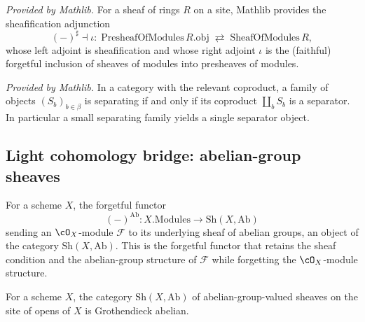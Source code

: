 \begin{lemma}
  \label{mathlib:sheafification_adjunction}
  \mathlibok
  \textit{Provided by Mathlib.}
  For a sheaf of rings \(R\) on a site, Mathlib provides the sheafification adjunction
  \[
    (-)^{\sharp}\dashv \iota:\;\mathrm{PresheafOfModules}\,R.\mathrm{obj}
    \;\rightleftarrows\;\mathrm{SheafOfModules}\,R ,
  \]
  whose left adjoint is sheafification and whose right adjoint \(\iota\) is the
  (faithful) forgetful inclusion of sheaves of modules into presheaves of modules.
\end{lemma}

\begin{lemma}
  \label{mathlib:isSeparator_sigma}
  \mathlibok
  \textit{Provided by Mathlib.}
  In a category with the relevant coproduct, a family of objects
  \((S_b)_{b\in\beta}\) is separating if and only if its coproduct
  \(\coprod_{b}S_b\) is a separator.  In particular a small separating family
  yields a single separator object.
\end{lemma}

\subsection{Light cohomology bridge: abelian-group sheaves}

\begin{definition}
  \label{found:modules_to_absheaf}
  For a scheme \(X\), the forgetful functor
  \[
    (-)^{\mathrm{Ab}}:X.\mathrm{Modules}\to\mathrm{Sh}(X,\mathrm{Ab})
  \]
  sending an \(\cO_X\)-module \(\mathcal F\) to its underlying sheaf of abelian
  groups, an object of the category \(\mathrm{Sh}(X,\mathrm{Ab})\).  This is the
  forgetful functor that retains the sheaf condition and the abelian-group
  structure of \(\mathcal F\) while forgetting the \(\cO_X\)-module structure.
\end{definition}

\begin{lemma}
  \label{found:absheaf_groth_abelian}
  For a scheme \(X\), the category \(\mathrm{Sh}(X,\mathrm{Ab})\) of
  abelian-group-valued sheaves on the site of opens of \(X\) is Grothendieck
  abelian.
\end{lemma}

